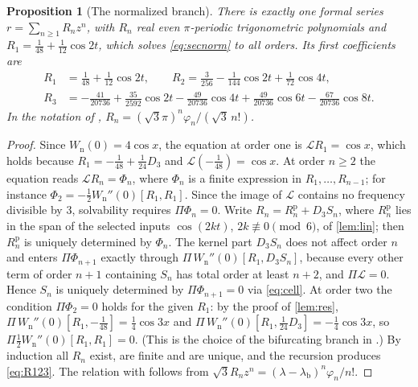 \documentclass[11pt]{amsart}
\numberwithin{equation}{section}
\newtheorem{proposition}[theorem]{Proposition}
\theoremstyle{definition}
\theoremstyle{remark}
\newcommand{\Wn}{W_{\mathrm n}}
\newcommand{\lb}{\lambda_{\mathrm b}}
\newcommand{\Lin}{\mathcal L}
\begin{document}
\begin{proposition}[The normalized branch]\label{prop:recursion}
There is exactly one formal series $r=\sum_{n\ge1}R_nz^n$, with $R_n$ real even $\pi$-periodic trigonometric polynomials and $R_1=\frac1{48}+\frac1{12}\cos2t$, which solves \eqref{eq:secnorm} to all orders. Its first coefficients are
\begin{equation}\label{eq:R123}
\begin{aligned}
R_1&=\tfrac1{48}+\tfrac{1}{12}\cos2t,\qquad R_2=\tfrac3{256}-\tfrac{1}{144}\cos2t+\tfrac{1}{72}\cos4t,\\
R_3&=-\tfrac{41}{20736}+\tfrac{35}{2592}\cos2t-\tfrac{49}{20736}\cos4t+\tfrac{49}{20736}\cos6t-\tfrac{67}{20736}\cos8t.
\end{aligned}
\end{equation}
In the notation of \cite{Had}, $R_n=(\sqrt3\pi)^n\varphi_n/(\sqrt3\,n!)$.
\end{proposition}

\begin{proof}
Since $\Wn(0)=4\cos x$, the equation at order one is $\Lin R_1=\cos x$, which holds because $R_1=-\frac1{48}+\frac1{24}D_3$ and $\Lin(-\frac1{48})=\cos x$. At order $n\ge2$ the equation reads $\Lin R_n=\Phi_n$, where $\Phi_n$ is a finite expression in $R_1,\dots,R_{n-1}$; for instance $\Phi_2=-\frac12\Wn''(0)[R_1,R_1]$. Since the image of $\Lin$ contains no frequency divisible by $3$, solvability requires $\Pi\Phi_n=0$. Write $R_n=R_n^{\mathrm p}+D_3S_n$, where $R_n^{\mathrm p}$ lies in the span of the selected inputs $\cos(2kt)$, $2k\not\equiv0\pmod6$, of \cref{lem:lin}; then $R_n^{\mathrm p}$ is uniquely determined by $\Phi_n$. The kernel part $D_3S_n$ does not affect order $n$ and enters $\Pi\Phi_{n+1}$ exactly through $\Pi\,\Wn''(0)[R_1,D_3S_n]$, because every other term of order $n+1$ containing $S_n$ has total order at least $n+2$, and $\Pi\Lin=0$. Hence $S_n$ is uniquely determined by $\Pi\Phi_{n+1}=0$ via \eqref{eq:cell}. At order two the condition $\Pi\Phi_2=0$ holds for the given $R_1$: by the proof of \cref{lem:res}, $\Pi\,\Wn''(0)[R_1,-\frac1{48}]=\frac14\cos3x$ and $\Pi\,\Wn''(0)[R_1,\frac1{24}D_3]=-\frac14\cos3x$, so $\Pi\frac12\Wn''(0)[R_1,R_1]=0$. (This is the choice of the bifurcating branch in \cite[Section 4.2]{Had}.) By induction all $R_n$ exist, are finite and are unique, and the recursion produces \eqref{eq:R123}. The relation with \cite{Had} follows from $\sqrt3R_nz^n=(\lambda-\lb)^n\varphi_n/n!$.
\end{proof}
\end{document}
